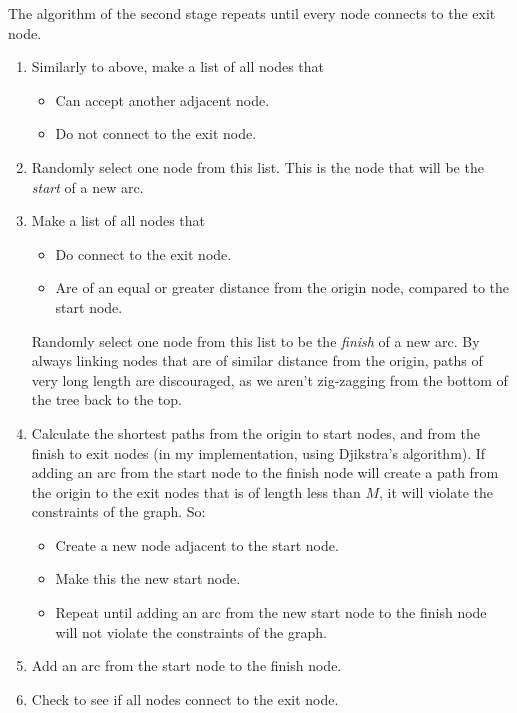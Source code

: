 \documentclass[landscape, a0, final]{a0poster}
\begin{document}
\begin{minipage}[c]{0.50\linewidth}
\begin{minipage}[c]{0.50\linewidth}
\begin{minipage}{0.9\linewidth}
The algorithm of the second stage repeats until every node connects to the exit node. 
\begin{enumerate} 
    \item Similarly to above, make a list of all nodes that 
        \begin{itemize} 
            \item Can accept another adjacent node.
            \item Do not connect to the exit node.
        \end{itemize} 
    \item Randomly select one node from this list.  This is the node that will be the \emph{start} of a new arc.
    \item Make a list of all nodes that 
        \begin{itemize} 
            \item Do connect to the exit node.
            \item Are of an equal or greater distance from the origin node, compared to the start node.
        \end{itemize} 
    Randomly select one node from this list to be the \emph{finish} of a new arc.  By always linking nodes that are of similar distance from the origin, paths of very long length are discouraged, as we aren't zig-zagging from the bottom of the tree back to the top.
    \item Calculate the shortest paths from the origin to start nodes, and from the finish to exit nodes (in my implementation, using Djikstra's algorithm).  If adding an arc from the start node to the finish node will create a path from the origin to the exit nodes that is of length less than $M$, it will violate the constraints of the graph.  So: 
        \begin{itemize} 
            \item Create a new node adjacent to the start node.
            \item Make this the new start node.
            \item Repeat until adding an arc from the new start node to the finish node will not violate the constraints of the graph.
        \end{itemize}
    \item Add an arc from the start node to the finish node.
    \item Check to see if all nodes connect to the exit node.
\end{enumerate} 


\end{minipage}
\end{minipage}
\end{minipage}
\end{document}
